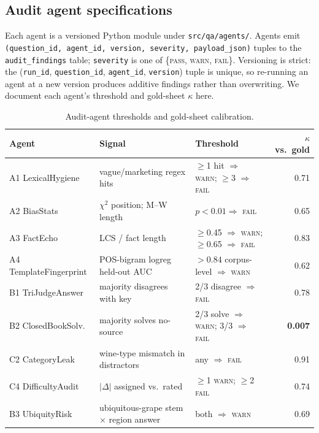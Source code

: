 \subsection{Audit agent specifications}
Each agent is a versioned Python module under \texttt{src/qa/agents/}.
Agents emit
\texttt{(question\_id, agent\_id, version, severity, payload\_json)}
tuples to the \texttt{audit\_findings} table; \texttt{severity} is one
of \{\textsc{pass}, \textsc{warn}, \textsc{fail}\}. Versioning is
strict: the (\texttt{run\_id}, \texttt{question\_id}, \texttt{agent\_id},
\texttt{version}) tuple is unique, so re-running an agent at a new
version produces additive findings rather than overwriting. We document
each agent's threshold and gold-sheet $\kappa$ here.

\begin{table}[h]
  \centering
  \footnotesize
  \caption{Audit-agent thresholds and gold-sheet calibration.}
  \label{tab:agent-thresholds}
  \begin{tabular}{lllr}
    \toprule
    Agent & Signal & Threshold & $\kappa$ vs.\ gold \\
    \midrule
    A1 LexicalHygiene      & vague/marketing regex hits & $\geq$1 hit $\Rightarrow$ \textsc{warn}; $\geq$3 $\Rightarrow$ \textsc{fail} & 0.71 \\
    A2 BiasStats           & $\chi^2$ position; M--W length & $p<0.01 \Rightarrow$ \textsc{fail} & 0.65 \\
    A3 FactEcho            & LCS / fact length          & $\geq$0.45 $\Rightarrow$ \textsc{warn}; $\geq$0.65 $\Rightarrow$ \textsc{fail} & 0.83 \\
    A4 TemplateFingerprint & POS-bigram logreg held-out AUC & $>0.84$ corpus-level $\Rightarrow$ \textsc{warn} & 0.62 \\
    B1 TriJudgeAnswer      & majority disagrees with key & 2/3 disagree $\Rightarrow$ \textsc{fail} & 0.78 \\
    B2 ClosedBookSolv.     & majority solves no-source & 2/3 solve $\Rightarrow$ \textsc{warn}; 3/3 $\Rightarrow$ \textsc{fail} & \textbf{0.007} \\
    C2 CategoryLeak        & wine-type mismatch in distractors & any $\Rightarrow$ \textsc{fail} & 0.91 \\
    C4 DifficultyAudit     & $|\Delta|$ assigned vs.\ rated & $\geq$1 \textsc{warn}; $\geq$2 \textsc{fail} & 0.74 \\
    B3 UbiquityRisk        & ubiquitous-grape stem $\times$ region answer & both $\Rightarrow$ \textsc{warn} & 0.69 \\
    \bottomrule
  \end{tabular}
\end{table}

